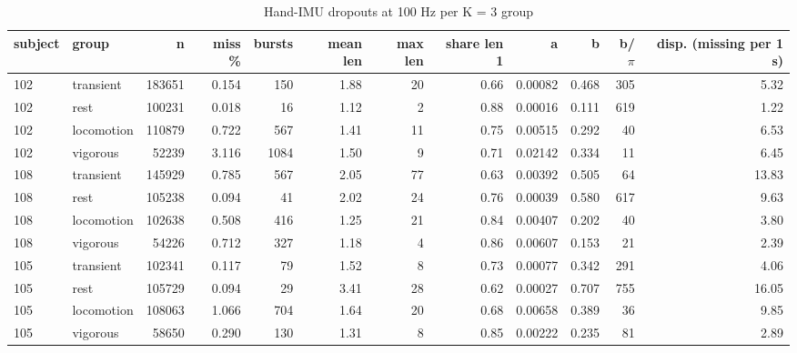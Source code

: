 \begin{table}[ht]
\centering
\small
\begin{tabular}{llrrrrrrrrrr}
\toprule
subject & group & n & miss \% & bursts & mean len & max len & share len 1 & a & b & b/$\pi$ & disp. (missing per 1 s) \\
\midrule
102 & transient & 183651 & 0.154 & 150 & 1.88 & 20 & 0.66 & 0.00082 & 0.468 & 305 & 5.32 \\
102 & rest & 100231 & 0.018 & 16 & 1.12 & 2 & 0.88 & 0.00016 & 0.111 & 619 & 1.22 \\
102 & locomotion & 110879 & 0.722 & 567 & 1.41 & 11 & 0.75 & 0.00515 & 0.292 & 40 & 6.53 \\
102 & vigorous & 52239 & 3.116 & 1084 & 1.50 & 9 & 0.71 & 0.02142 & 0.334 & 11 & 6.45 \\
108 & transient & 145929 & 0.785 & 567 & 2.05 & 77 & 0.63 & 0.00392 & 0.505 & 64 & 13.83 \\
108 & rest & 105238 & 0.094 & 41 & 2.02 & 24 & 0.76 & 0.00039 & 0.580 & 617 & 9.63 \\
108 & locomotion & 102638 & 0.508 & 416 & 1.25 & 21 & 0.84 & 0.00407 & 0.202 & 40 & 3.80 \\
108 & vigorous & 54226 & 0.712 & 327 & 1.18 & 4 & 0.86 & 0.00607 & 0.153 & 21 & 2.39 \\
105 & transient & 102341 & 0.117 & 79 & 1.52 & 8 & 0.73 & 0.00077 & 0.342 & 291 & 4.06 \\
105 & rest & 105729 & 0.094 & 29 & 3.41 & 28 & 0.62 & 0.00027 & 0.707 & 755 & 16.05 \\
105 & locomotion & 108063 & 1.066 & 704 & 1.64 & 20 & 0.68 & 0.00658 & 0.389 & 36 & 9.85 \\
105 & vigorous & 58650 & 0.290 & 130 & 1.31 & 8 & 0.85 & 0.00222 & 0.235 & 81 & 2.89 \\
\bottomrule
\end{tabular}
\caption{Hand-IMU dropouts at 100 Hz per K = 3 group}
\end{table}
